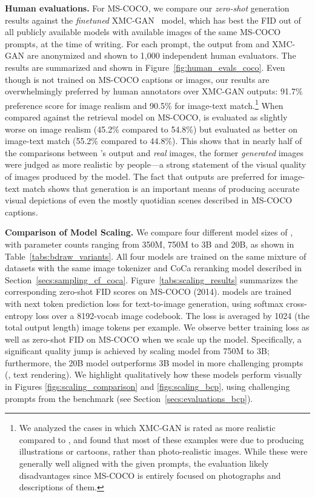 \textbf{Human evaluations.} For MS-COCO, we compare our \textit{zero-shot} generation results against the \textit{finetuned} XMC-GAN~\cite{zhang2021cross} model, which has best the FID out of all publicly available models with available images of the same MS-COCO prompts, at the time of writing. For each prompt, the output from \bdraw and XMC-GAN are anonymized and shown to 1,000 independent human evaluators. The results are summarized and shown in Figure~\ref{fig:human_evals_coco}.  Even though \bdraw is not trained on MS-COCO captions or images, our results are overwhelmingly preferred by human annotators over XMC-GAN outputs: 91.7\% preference score for image realism and 90.5\% for image-text match.\footnote{We analyzed the cases in which XMC-GAN is rated as more realistic compared to \bdraw, and found that most of these examples were due to \bdraw producing illustrations or cartoons, rather than photo-realistic images. While these were generally well aligned with the given prompts, the evaluation likely disadvantages \bdraw since MS-COCO is entirely focused on photographs and descriptions of them.}
When compared against the retrieval model on MS-COCO, \bdraw is evaluated as slightly worse on image realism (45.2\% compared to 54.8\%)
but evaluated as better on image-text match (55.2\% compared to 44.8\%). This shows that in nearly half of the comparisons between \bdraw's output and \textit{real} images, the former \textit{generated} images were judged as more realistic by people---a strong statement of the visual quality of images produced by the model. The fact that \bdraw outputs are preferred for image-text match shows that generation is an important means of producing accurate visual depictions of even the mostly quotidian scenes described in MS-COCO captions.



\textbf{Comparison of Model Scaling.} 
We compare four different model sizes of \bdraw, with parameter counts ranging from 350M, 750M to 3B and 20B, as shown in Table~\ref{tabs:bdraw_variants}. All four models are trained on the same mixture of datasets with the same image tokenizer and CoCa reranking model described in Section~\ref{secs:sampling_cf_coca}. 
Figure~\ref{tabs:scaling_results} summarizes the corresponding zero-shot FID scores on MS-COCO (2014). \bdraw models are trained with next token prediction loss for text-to-image generation, using softmax cross-entropy loss over a 8192-vocab image codebook. The loss is averaged by 1024 (the total output length) image tokens per example. We observe better training loss as well as zero-shot FID on MS-COCO when we scale up the model. Specifically, a significant quality jump is achieved by scaling model from 750M to 3B; furthermore, the 20B model outperforms 3B model in more challenging prompts (\eg, text rendering).
We highlight qualitatively how these models perform visually in Figures \ref{figs:scaling_comparison} and \ref{figs:scaling_bcp}, using challenging prompts from the \bcpa{} benchmark (see Section~\ref{secs:evaluations_bcp}).


